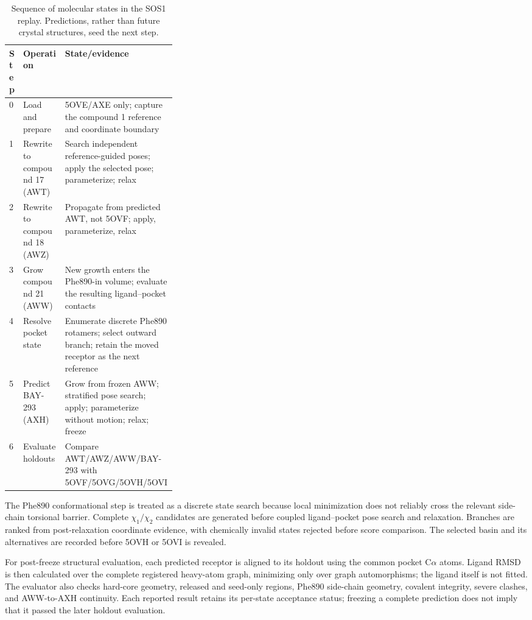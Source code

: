 \documentclass[11pt]{article}
\begin{document}
\begin{small}
\begin{table}[htbp]
\centering\small
\caption{Sequence of molecular states in the SOS1 replay. Predictions, rather than future crystal structures, seed the next step.}
\label{tab:appA_sos1_beats}
\begin{tabularx}{\linewidth}{@{}p{0.07\linewidth}p{0.25\linewidth}X@{}}
\toprule
\textbf{Step} & \textbf{Operation} & \textbf{State/evidence}\\
\midrule
0 & Load and prepare & 5OVE/AXE only; capture the compound 1 reference and coordinate boundary\\
1 & Rewrite to compound 17 (AWT) & Search independent reference-guided poses; apply the selected pose; parameterize; relax\\
2 & Rewrite to compound 18 (AWZ) & Propagate from predicted AWT, not 5OVF; apply, parameterize, relax\\
3 & Grow compound 21 (AWW) & New growth enters the Phe890-in volume; evaluate the resulting ligand--pocket contacts\\
4 & Resolve pocket state & Enumerate discrete Phe890 rotamers; select outward branch; retain the moved receptor as the next reference\\
5 & Predict BAY-293 (AXH) & Grow from frozen AWW; stratified pose search; apply; parameterize without motion; relax; freeze\\
6 & Evaluate holdouts & Compare AWT/AWZ/AWW/BAY-293 with 5OVF/5OVG/5OVH/5OVI\\
\bottomrule
\end{tabularx}
\end{table}

The Phe890 conformational step is treated as a discrete state search because local minimization does not reliably cross the relevant side-chain torsional barrier. Complete $\chi_1/\chi_2$ candidates are generated before coupled ligand--pocket pose search and relaxation. Branches are ranked from post-relaxation coordinate evidence, with chemically invalid states rejected before score comparison. The selected basin and its alternatives are recorded before 5OVH or 5OVI is revealed.

For post-freeze structural evaluation, each predicted receptor is aligned to its holdout using the common pocket C$\alpha$ atoms. Ligand RMSD is then calculated over the complete registered heavy-atom graph, minimizing only over graph automorphisms; the ligand itself is not fitted. The evaluator also checks hard-core geometry, released and seed-only regions, Phe890 side-chain geometry, covalent integrity, severe clashes, and AWW-to-AXH continuity. Each reported result retains its per-state acceptance status; freezing a complete prediction does not imply that it passed the later holdout evaluation.


\end{small}
\end{document}
